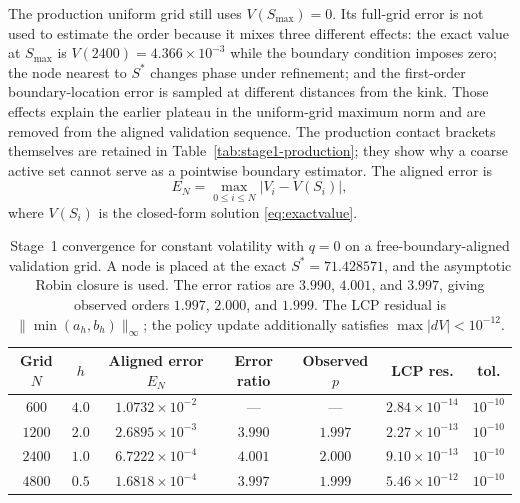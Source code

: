 \documentclass[11pt,a4paper]{article}
\theoremstyle{definition}
\theoremstyle{remark}
\begin{document}
The production uniform grid still uses $V(S_{\max})=0$. Its full-grid error
is not used to estimate the order because it mixes three different effects:
the exact value at $S_{\max}$ is $V(2400)=4.366\times10^{-3}$ while the
boundary condition imposes zero; the node nearest to $S^*$ changes phase
under refinement; and the first-order boundary-location error is sampled at
different distances from the kink. Those effects explain the earlier
plateau in the uniform-grid maximum norm and are removed from the aligned
validation sequence. The production contact brackets themselves are retained
in Table~\ref{tab:stage1-production}; they show why a coarse active set cannot
serve as a pointwise boundary estimator. The aligned error is
\begin{equation}
    E_N=\max_{0\le i\le N}|V_i-V(S_i)|,
    \label{eq:maxerror}
\end{equation}
where $V(S_i)$ is the closed-form solution \eqref{eq:exactvalue}.

\begin{table}[H]
\centering
\scriptsize
\setlength{\tabcolsep}{5pt}
\begin{tabular}{ccccccc}
\toprule
\textbf{Grid $N$} & \textbf{$h$} & \textbf{Aligned error $E_N$} &
\textbf{Error ratio} & \textbf{Observed $p$} &
\textbf{LCP res.} & \textbf{tol.} \\
\midrule
$600$  & $4.0$ & $1.0732\times10^{-2}$ & ---     & ---     &
$2.84\times10^{-14}$ & $10^{-10}$ \\
$1200$ & $2.0$ & $2.6895\times10^{-3}$ & $3.990$ & $1.997$ &
$2.27\times10^{-13}$ & $10^{-10}$ \\
$2400$ & $1.0$ & $6.7222\times10^{-4}$ & $4.001$ & $2.000$ &
$9.10\times10^{-13}$ & $10^{-10}$ \\
$4800$ & $0.5$ & $1.6818\times10^{-4}$ & $3.997$ & $1.999$ &
$5.46\times10^{-12}$ & $10^{-10}$ \\
\bottomrule
\end{tabular}
\caption{Stage~1 convergence for constant volatility with $q=0$ on a
free-boundary-aligned validation grid. A node is placed at the exact
$S^*=71.428571$, and the asymptotic Robin closure is used. The error ratios
are $3.990$, $4.001$, and $3.997$, giving observed orders $1.997$, $2.000$,
and $1.999$. The LCP residual is $\|\min(a_h,b_h)\|_\infty$; the policy
update additionally satisfies $\max|dV|<10^{-12}$.}
\label{tab:stage1}
\end{table}
\end{document}
